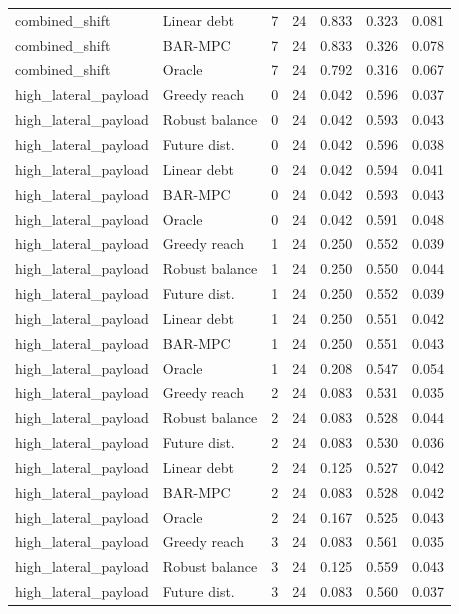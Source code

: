\begin{longtable}{llrrrrr}
combined\_shift & Linear debt & 7 & 24 & 0.833 & 0.323 & 0.081 \\
combined\_shift & BAR-MPC & 7 & 24 & 0.833 & 0.326 & 0.078 \\
combined\_shift & Oracle & 7 & 24 & 0.792 & 0.316 & 0.067 \\
high\_lateral\_payload & Greedy reach & 0 & 24 & 0.042 & 0.596 & 0.037 \\
high\_lateral\_payload & Robust balance & 0 & 24 & 0.042 & 0.593 & 0.043 \\
high\_lateral\_payload & Future dist. & 0 & 24 & 0.042 & 0.596 & 0.038 \\
high\_lateral\_payload & Linear debt & 0 & 24 & 0.042 & 0.594 & 0.041 \\
high\_lateral\_payload & BAR-MPC & 0 & 24 & 0.042 & 0.593 & 0.043 \\
high\_lateral\_payload & Oracle & 0 & 24 & 0.042 & 0.591 & 0.048 \\
high\_lateral\_payload & Greedy reach & 1 & 24 & 0.250 & 0.552 & 0.039 \\
high\_lateral\_payload & Robust balance & 1 & 24 & 0.250 & 0.550 & 0.044 \\
high\_lateral\_payload & Future dist. & 1 & 24 & 0.250 & 0.552 & 0.039 \\
high\_lateral\_payload & Linear debt & 1 & 24 & 0.250 & 0.551 & 0.042 \\
high\_lateral\_payload & BAR-MPC & 1 & 24 & 0.250 & 0.551 & 0.043 \\
high\_lateral\_payload & Oracle & 1 & 24 & 0.208 & 0.547 & 0.054 \\
high\_lateral\_payload & Greedy reach & 2 & 24 & 0.083 & 0.531 & 0.035 \\
high\_lateral\_payload & Robust balance & 2 & 24 & 0.083 & 0.528 & 0.044 \\
high\_lateral\_payload & Future dist. & 2 & 24 & 0.083 & 0.530 & 0.036 \\
high\_lateral\_payload & Linear debt & 2 & 24 & 0.125 & 0.527 & 0.042 \\
high\_lateral\_payload & BAR-MPC & 2 & 24 & 0.083 & 0.528 & 0.042 \\
high\_lateral\_payload & Oracle & 2 & 24 & 0.167 & 0.525 & 0.043 \\
high\_lateral\_payload & Greedy reach & 3 & 24 & 0.083 & 0.561 & 0.035 \\
high\_lateral\_payload & Robust balance & 3 & 24 & 0.125 & 0.559 & 0.043 \\
high\_lateral\_payload & Future dist. & 3 & 24 & 0.083 & 0.560 & 0.037 \\

\end{longtable}
